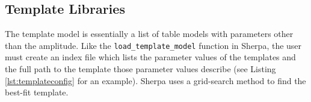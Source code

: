\subsection{Template Libraries}
The template model is essentially a list of table models with parameters other than the amplitude. Like the \texttt{load\_template\_model} function in Sherpa, the user must create an index file which lists the parameter values of the templates and the full path to the template those parameter values describe (see Listing \ref{lst:templateconfig} for an example). Sherpa uses a grid-search method to find the best-fit template.